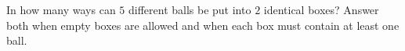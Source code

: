 In how many ways can $5$ different balls be put into $2$ identical boxes? Answer both when empty boxes are allowed and when each box must contain at least one ball.
